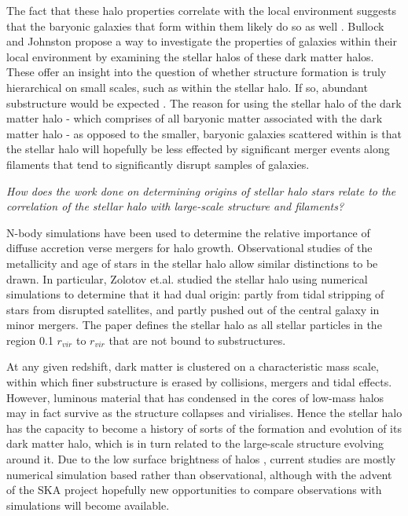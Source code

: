 \documentclass[journal]{IEEEtran}
\begin{document}

The fact that these halo properties correlate with the local environment suggests that the baryonic galaxies that form within them likely do so as well \cite{hahn07b}.  Bullock and Johnston \cite{bullock05} propose a way to investigate the properties of galaxies within their local environment by examining the stellar halos of these dark matter halos. These offer an insight into the question of whether structure formation is truly hierarchical on small scales, such as within the stellar halo. If so, abundant substructure would be expected \cite{bullock05}. The reason for using the stellar halo of the dark matter halo - which comprises of all baryonic matter associated with the dark matter halo - as opposed to the smaller, baryonic galaxies scattered within is that the stellar halo will hopefully be less effected by significant merger events along filaments that tend to significantly disrupt samples of galaxies.


\emph{How does the work done on determining origins of stellar halo stars relate to the correlation of the stellar halo with large-scale structure and filaments?}

N-body simulations have been used to determine the relative importance of diffuse accretion verse mergers for halo growth. Observational studies of the metallicity and age of stars in the stellar halo allow similar distinctions to be drawn. In particular, Zolotov et.al. \cite{zolotov09} studied the stellar halo using numerical simulations to determine that it had dual origin: partly from tidal stripping of stars from disrupted satellites, and partly pushed out of the central galaxy in minor mergers. The paper defines the stellar halo as all stellar particles in the region 0.1 $r_{vir}$ to $r_{vir}$ that are not bound to substructures.

At any given redshift, dark matter is clustered on a characteristic mass scale, within which finer substructure is erased by collisions, mergers and tidal effects. \cite{white78} However, luminous material that has condensed in the cores of low-mass halos may in fact survive as the structure collapses and virialises. Hence the stellar halo has the capacity to become a history of sorts of the formation and evolution of its dark matter halo, which is in turn related to the large-scale structure evolving around it. Due to the low surface brightness of halos \cite{zolotov09}, current studies are mostly numerical simulation based rather than observational, although with the advent of the SKA project hopefully new opportunities to compare observations with simulations will become available.
\end{document}

